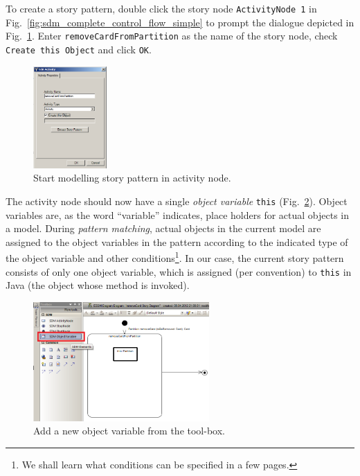 To create a story pattern, double click the story node \texttt{ActivityNode 1} in Fig.~\ref{fig:sdm_complete_control_flow_simple} to prompt the dialogue depicted in Fig.~\ref{fig:story_pattern}.  
Enter \texttt{remove\-Card\-From\-Partition} as the name of the story node, check \texttt{Create this Object} and click \texttt{OK}.

\begin{figure}[htpb]
\begin{center} 
  \includegraphics[width=0.25\textwidth]{pics/sdmBilder/removeCard/sdm07RAW}
  \caption{Start modelling story pattern in activity node.}  
  \label{fig:story_pattern}
\end{center}
\end{figure}

The activity node should now have a single \emph{object variable} \texttt{this}
(Fig.~\ref{fig:tool_box}). 
Object variables are, as the word ``variable'' indicates, place holders for actual objects in a model.  
During \emph{pattern matching},
actual objects in the  current model are assigned to the object variables in the pattern according to  the indicated type of the object variable and other conditions\footnote{We shall learn what conditions can be specified in a
few pages.}. 
In our case, the current story pattern consists of only one object variable, which is assigned (per convention) to \texttt{this} in Java (the object whose method is invoked).

\begin{figure}[htp]
\begin{center}
  \includegraphics[width=0.6\textwidth]{pics/sdmBilder/removeCard/sdm09RAW}
  \caption{Add a new object variable from the tool-box.}  
  \label{fig:tool_box}
\end{center}
\end{figure}

